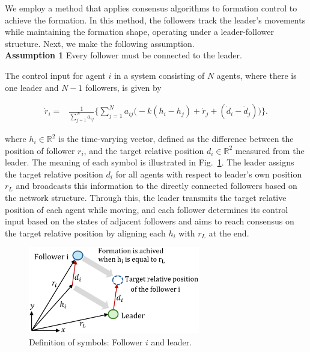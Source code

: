 \documentclass[a4paper,fleqn,10pt,twocolumn]{SICE_ISCS}
\newcommand{\Figref}[1]{{Fig.~\ref{#1}}}
\begin{document}
We employ a method that applies consensus algorithms to formation control to achieve the formation{\cite{栗城モデル}}. In this method, the followers track the leader's movements while maintaining the formation shape, operating under a leader-follower structure. 
Next, we make the following assumption.\\
\textbf{Assumption 1} Every follower must be connected to the leader.

The control input for agent $i$ in a system consisting of $N$ agents, where there is one leader and $N-1$ followers, is given by

\begin{small}
\begin{align}
	\label{kuriki_consensus}
	\dot{r}_i=&\frac{1}{\sum_{j=1}^{N}a_{ij}}
	\bigg\{\sum_{j=1}^{N}a_{ij}\big(-k(h_i - h_j)+\dot{r}_j+(\dot{d}_i-\dot{d}_j)\big)\bigg\}.
\end{align}
\end{small}

\noindent where $h_i \in {\mathbb{R}}^2$ is the time-varying vector, defined as the difference between the position of follower $r_i$, and the target relative position $d_i \in {\mathbb{R}}^2$ measured from the leader. The meaning of each symbol is illustrated in \Figref{DefinitionofSymbols(L-F)}. The leader assigns the target relative position $d_i$ for all agents with respect to leader's own position $r_L$ and broadcasts this information to the directly connected followers based on the network structure. Through this, the leader transmits the target relative position of each agent while moving, and each follower determines its control input based on the states of adjacent followers and aims to reach consensus on the target relative position by aligning each $h_i$ with $r_L$ at the end. 

\begin{figure}[b]
	\begin{center}
		\includegraphics[width=75mm]{Fig/DefSymbol_(L-F).eps}
		\caption{Definition of symbols: Follower $i$ and leader.}
		\label{DefinitionofSymbols(L-F)}
	\end{center}
	\vspace{-1mm}
\end{figure}
\end{document}
